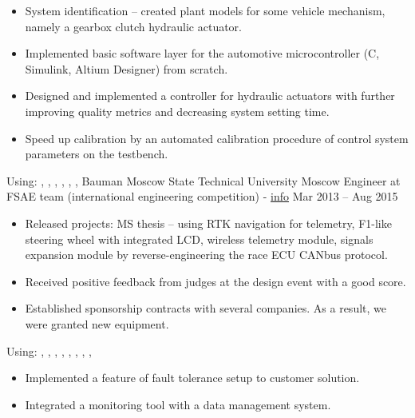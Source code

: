 \begin{itemize}
    \item System identification -- created plant models for some vehicle mechanism, namely a gearbox clutch hydraulic actuator.
    \item Implemented basic software layer for the automotive microcontroller (C, Simulink, Altium Designer) from scratch.
    \item Designed and implemented a controller for hydraulic actuators with further improving quality metrics and decreasing system setting time.
    \item Speed up calibration by an automated calibration procedure of control system parameters on the testbench.
\end{itemize}
Using: , , , , , , 
\horizontalline
% 
\ressubheading
{Bauman Moscow State Technical University}
{}
{Moscow}
{Engineer at FSAE team (international engineering competition) - \href{https://baumanracing.ru/en/}{info}}
{Mar 2013 -- Aug 2015}
\begin{itemize}
    \item Released projects: MS thesis -- using RTK navigation for telemetry, F1-like steering wheel with integrated LCD, wireless telemetry module, signals expansion module by reverse-engineering the race ECU CANbus protocol.
    \item Received positive feedback from judges at the design event with a good score.
    \item Established sponsorship contracts with several companies. As a result, we were granted new equipment.
\end{itemize}
Using: , , , , , , , , 
\horizontalline
% 
\begin{itemize}
    \item Implemented a feature of fault tolerance setup to customer solution.
    \item Integrated a monitoring tool with a data management system.
\end{itemize}
